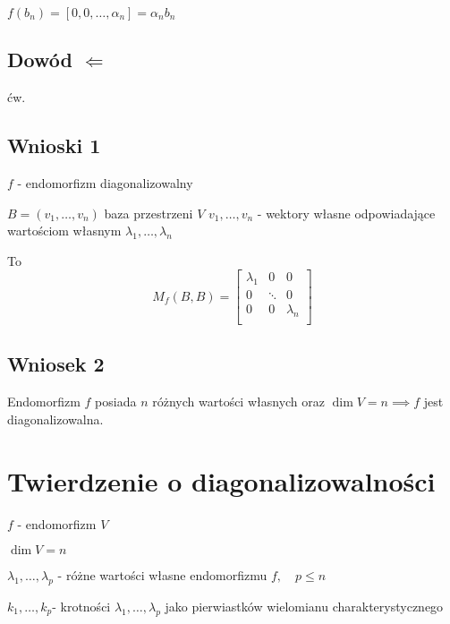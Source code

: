 \documentclass[11pt]{article}
\begin{document}
$f(b_n) = [0,0,\ldots,\alpha_n] = \alpha_n b_n$ 

\subsection{Dowód $\Leftarrow$}
ćw.

\subsection{Wnioski 1}
$f$ - endomorfizm diagonalizowalny 

$B = (v_1,\ldots,v_n)$ baza przestrzeni $V$ 
$ v_1,\ldots,v_n$ - wektory własne odpowiadające wartościom własnym $\lambda_1,\ldots,\lambda_n$ 

To 
$$ M_f(B,B) = \begin{bmatrix}
	\lambda_1 & 0  & 0\\
	0 & \ddots & 0 \\
	0 & 0 & \lambda_n\\
\end{bmatrix}$$

\subsection{Wniosek 2}
Endomorfizm $f$ posiada $n$ różnych wartości własnych oraz $\dim{V} = n \implies f$ jest diagonalizowalna.

\section{Twierdzenie o diagonalizowalności} 
$f$ - endomorfizm $V$

$\dim{V} = n $

$ \lambda_1,\ldots,\lambda_p $ - różne wartości własne endomorfizmu $f, \quad p \leq n$

$k_1,\ldots,k_p$- krotności $\lambda_1,\ldots,\lambda_p$ jako pierwiastków wielomianu charakterystycznego 
\end{document}
